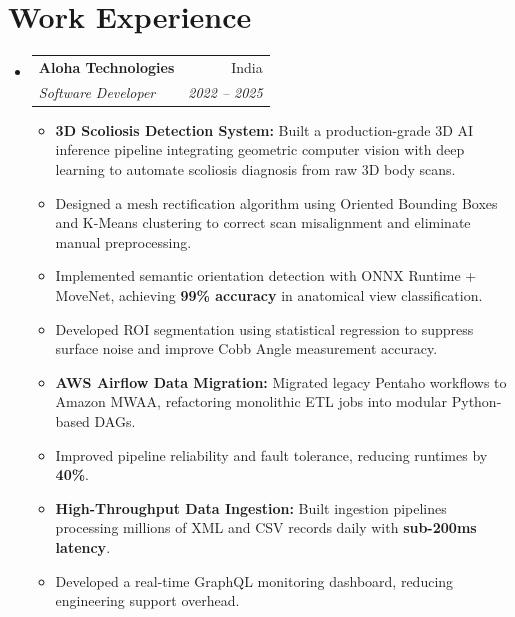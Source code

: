 \documentclass[letterpaper,11pt]{article}
\makeatletter
\newcommand{\resumeItem}[1]{\item\small{#1}}
\newcommand{\resumeSubheading}[4]{
  \item
  \begin{tabular*}{0.97\textwidth}{l@{\extracolsep{\fill}}r}
    \textbf{#1} & #2 \\
    \textit{\small#3} & \textit{\small #4} \\
  \end{tabular*}
}
\newcommand{\resumeSubHeadingListStart}{\begin{itemize}[leftmargin=0.15in, label={}]}
\newcommand{\resumeSubHeadingListEnd}{\end{itemize}}
\newcommand{\resumeItemListStart}{\begin{itemize}[leftmargin=0.30in, label=$\circ$, itemsep=0pt]}
\newcommand{\resumeItemListEnd}{\end{itemize}\vspace{-5pt}}
\makeatother
\begin{document}
\section{Work Experience}
\resumeSubHeadingListStart
  \resumeSubheading{Aloha Technologies}{India}{Software Developer}{2022 -- 2025}
  \resumeItemListStart
    \resumeItem{\textbf{3D Scoliosis Detection System:} Built a production-grade 3D AI inference pipeline integrating geometric computer vision with deep learning to automate scoliosis diagnosis from raw 3D body scans.}
    \resumeItem{Designed a mesh rectification algorithm using Oriented Bounding Boxes and K-Means clustering to correct scan misalignment and eliminate manual preprocessing.}
    \resumeItem{Implemented semantic orientation detection with ONNX Runtime + MoveNet, achieving \textbf{99\% accuracy} in anatomical view classification.}
    \resumeItem{Developed ROI segmentation using statistical regression to suppress surface noise and improve Cobb Angle measurement accuracy.}
    \resumeItem{\textbf{AWS Airflow Data Migration:} Migrated legacy Pentaho workflows to Amazon MWAA, refactoring monolithic ETL jobs into modular Python-based DAGs.}
    \resumeItem{Improved pipeline reliability and fault tolerance, reducing runtimes by \textbf{40\%}.}
    \resumeItem{\textbf{High-Throughput Data Ingestion:} Built ingestion pipelines processing millions of XML and CSV records daily with \textbf{sub-200ms latency}.}
    \resumeItem{Developed a real-time GraphQL monitoring dashboard, reducing engineering support overhead.}
  \resumeItemListEnd
\resumeSubHeadingListEnd
\end{document}
